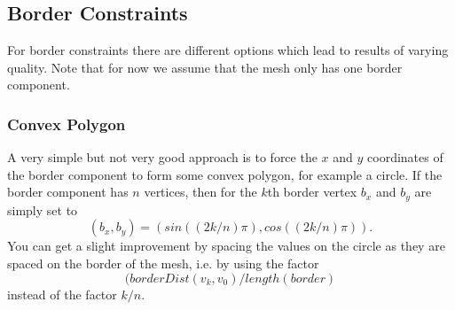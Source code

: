 \subsection{Border Constraints}
For border constraints there are different options which lead to results of varying quality. Note that for now we assume that the mesh only has one border component.

\subsubsection*{Convex Polygon}
A very simple but not very good approach is to force the $x$ and $y$ coordinates of the border component to form some convex polygon, for example a circle. If the border component has $n$ vertices, then for the $k$th border vertex $b_x$ and $b_y$ are simply set to
\[(b_x,b_y) = (sin((2k/n)\pi),cos((2k/n)\pi)).\] 
You can get a slight improvement by spacing the values on the circle as they are spaced on the border of the mesh, i.e. by using the factor 
\[(borderDist(v_k,v_0)/length(border)\] 
instead of the factor $k/n$.


